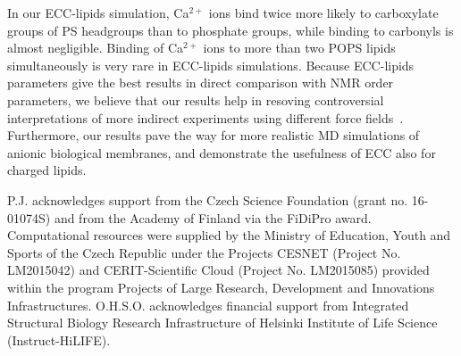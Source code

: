 \documentclass[journal=jpcbfk,manuscript=article]{achemso}
\begin{document}
In our ECC-lipids simulation, Ca$^{2+}$ ions bind twice more likely to carboxylate groups
of PS headgroups than to phosphate groups, while binding to carbonyls is almost negligible.
Binding of Ca$^{2+}$ ions to more than two POPS lipids simultaneously is very rare in ECC-lipids simulations.
Because ECC-lipids parameters give the best results in direct comparison with NMR order parameters, 
we believe that our results help in resoving controversial interpretations of more indirect experiments
using different force fields~\cite{melcrova16,valentine18,hallock18}.
Furthermore, our results pave the way for more realistic MD simulations of anionic biological membranes,
and demonstrate the usefulness of ECC also for charged lipids.




\listoftodos


\begin{acknowledgement} 
P.J. acknowledges support from the Czech Science Foundation (grant no. 16-01074S)  
and from the Academy of Finland via the FiDiPro award. 
Computational resources were supplied by the Ministry of Education, Youth and Sports 
of the Czech Republic under the Projects CESNET (Project No. LM2015042) and CERIT-Scientific 
Cloud (Project No. LM2015085) provided within the program Projects of Large Research, 
Development and Innovations Infrastructures. 
O.H.S.O. acknowledges financial support from 
Integrated Structural Biology Research Infrastructure of 
Helsinki Institute of Life Science (Instruct-HiLIFE). 
\end{acknowledgement} 
 
\end{document}
